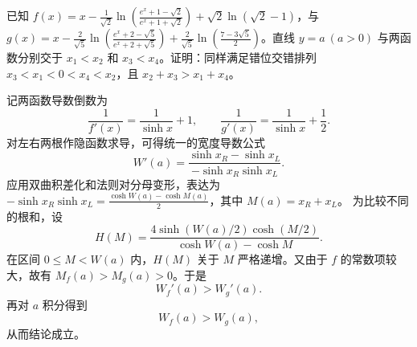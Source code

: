 \begin{example}
已知 $f(x) = x - \frac{1}{\sqrt{2}}\ln\left(\frac{e^x+1-\sqrt{2}}{e^x+1+\sqrt{2}}\right) + \sqrt{2}\ln(\sqrt{2}-1)$，与 $g(x) = x - \frac{2}{\sqrt{5}}\ln\left(\frac{e^x+2-\sqrt{5}}{e^x+2+\sqrt{5}}\right) + \frac{2}{\sqrt{5}}\ln\left(\frac{7-3\sqrt{5}}{2}\right)$。直线 $y=a \ (a>0)$ 与两函数分别交于 $x_1 < x_2$ 和 $x_3 < x_4$。证明：同样满足错位交错排列 $x_3 < x_1 < 0 < x_4 < x_2$，且 $x_2 + x_3 > x_1 + x_4$。
\end{example}

\begin{solution}
记两函数导数倒数为
\[
\frac{1}{f'(x)} = \frac{1}{\sinh x} + 1,
\qquad
\frac{1}{g'(x)} = \frac{1}{\sinh x} + \frac{1}{2}.
\]
对左右两根作隐函数求导，可得统一的宽度导数公式
\[
W'(a) = \frac{\sinh x_R - \sinh x_L}{-\sinh x_R \sinh x_L}.
\]
应用双曲积差化和法则对分母变形，表达为 $-\sinh x_R \sinh x_L = \frac{\cosh W(a) - \cosh M(a)}{2}$，其中 $M(a) = x_R + x_L$。
为比较不同的根和，设
\[
H(M) = \frac{4\sinh(W(a)/2)\cosh(M/2)}{\cosh W(a) - \cosh M}.
\]
在区间 $0 \le M < W(a)$ 内，$H(M)$ 关于 $M$ 严格递增。又由于 $f$ 的常数项较大，故有 $M_f(a) > M_g(a) > 0$。于是
\[
W_f'(a)>W_g'(a).
\]
再对 $a$ 积分得到
\[
W_f(a)>W_g(a),
\]
从而结论成立。
\end{solution}
